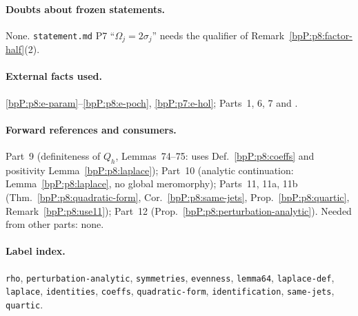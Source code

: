 \paragraph{Doubts about frozen statements.} None. \texttt{statement.md} P7 ``$\Omega_j=2\sigma_j$'' needs the qualifier of Remark~\ref{bpP:p8:factor-half}(2).

\paragraph{External facts used.} \ref{bpP:p8:e-param}--\ref{bpP:p8:e-poch}, \ref{bpP:p7:e-hol}; Parts~1, 6, 7 and .

\paragraph{Forward references and consumers.} Part~9 (definiteness of $Q_h$, Lemmas~74--75: uses Def.~\ref{bpP:p8:coeffs} and positivity Lemma~\ref{bpP:p8:laplace}); Part~10 (analytic continuation: Lemma~\ref{bpP:p8:laplace}, no global meromorphy); Parts~11, 11a, 11b (Thm.~\ref{bpP:p8:quadratic-form}, Cor.~\ref{bpP:p8:same-jets}, Prop.~\ref{bpP:p8:quartic}, Remark~\ref{bpP:p8:use11}); Part~12 (Prop.~\ref{bpP:p8:perturbation-analytic}). Needed from other parts: none.

\paragraph{Label index.} \texttt{rho}, \texttt{perturbation-analytic}, \texttt{symmetries}, \texttt{evenness}, \texttt{lemma64}, \texttt{laplace-def}, \texttt{laplace}, \texttt{identities}, \texttt{coeffs}, \texttt{quadratic-form}, \texttt{identification}, \texttt{same-jets}, \texttt{quartic}.
\par\endgroup
